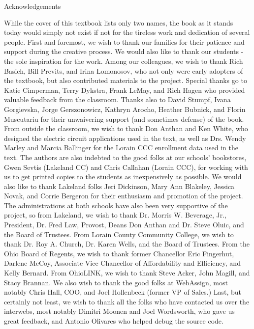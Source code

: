 \centerline{ {\sc Acknowledgements}}

\bigskip


While the cover of this textbook lists only two names, the book as it stands today would simply not exist if not for the tireless work and dedication of several people. First and foremost, we wish to thank our families for their patience and support during the creative process.  We would also like to thank our students  - the sole inspiration for the work.  Among our colleagues, we wish to thank Rich Basich, Bill Previts, and  Irina Lomonosov, who not only were early adopters of the textbook, but also contributed materials to the project. Special thanks go to Katie Cimperman, Terry Dykstra, Frank LeMay, and Rich Hagen who provided valuable feedback from the classroom. Thanks also to David Stumpf, Ivana Gorgievska, Jorge Gerszonowicz,  Kathryn Arocho, Heather Bubnick, and Florin Muscutariu for their unwaivering support (and sometimes defense) of the book.  From outside the classroom, we wish to thank Don Anthan and Ken White, who designed the electric circuit applications used in the text, as well as Drs. Wendy Marley and  Marcia Ballinger for the Lorain CCC enrollment data used in the text.  The authors are also indebted to the good folks at our schools' bookstores, Gwen Sevtis (Lakeland CC) and Chris Callahan (Lorain CCC), for working with us to get printed copies to the students as inexpensively as possible. We would also like to thank Lakeland folks Jeri Dickinson, Mary Ann Blakeley, Jessica Novak, and Corrie Bergeron for their enthusiasm and promotion of the project.  The administrations at both schools have also been very supportive of the project, so from Lakeland, we wish to thank Dr. Morris W. Beverage, Jr., President, Dr. Fred Law, Provost, Deans Don Anthan and Dr. Steve Oluic, and the Board of Trustees.  From Lorain County Community College, we wish to thank Dr. Roy A. Church, Dr. Karen Wells, and the Board of Trustees.  From the Ohio Board of Regents, we wish to thank former Chancellor Eric Fingerhut, Darlene McCoy, Associate Vice Chancellor of Affordability and Efficiency, and  Kelly Bernard.  From OhioLINK, we wish to thank Steve Acker, John Magill, and Stacy Brannan.  We also wish to thank the good folks at WebAssign, most notably Chris Hall, COO, and Joel Hollenbeck (former VP of Sales.) Last, but certainly not least, we wish to thank all the folks who have contacted us over the interwebs, most notably Dimitri Moonen and Joel Wordsworth, who gave us great feedback, and Antonio Olivares who helped debug the source code.